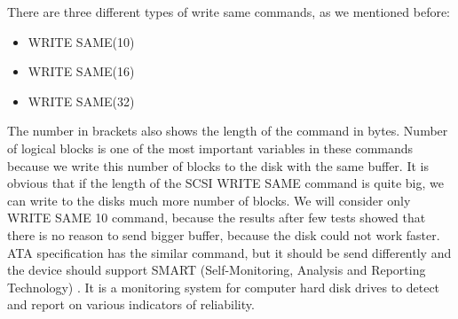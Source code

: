There are three different types of write same commands, as we mentioned before:
\begin{itemize}
	\setlength{\itemsep}{-2mm}
	\item WRITE SAME(10)
	\item WRITE SAME(16)
	\item WRITE SAME(32)
\end{itemize}
The number in brackets also shows the length of the command in bytes. Number of logical blocks is one of the most important variables in these commands because we write this number of blocks to the disk with the same buffer. It is obvious that if the length of the SCSI WRITE SAME command is quite big, we can write to the disks much more number of blocks. We will consider only WRITE SAME 10 command, because the results after few tests showed that there is no reason to send bigger buffer, because the disk could not work faster. ATA specification has the similar command, but it should be send differently and the device should support SMART (Self-Monitoring, Analysis and Reporting Technology) \cite{ata_spec}. It is a monitoring system for computer hard disk drives to detect and report on various indicators of reliability.


